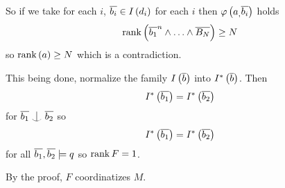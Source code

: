 \documentclass{amsart}
\begin{document}
So if we take for each $i$, $\overline{b_i}\in I\left(d_i\right)$ for each $i$ then
$\varphi\left(a_, \overline{b_i}\right)$ holds
\begin{equation}
\operatorname{rank}\left(\overline{b_1}^n \land \ldots \land \overline{B_N}
\right) \geq N
\end{equation}
so $\operatorname{rank}\left(a\right)\geq N$ which is a contradiction.

This being done, normalize the family $I\left(\overline{b}\right)$ into
$I^*\left(\overline{b}\right)$. Then 
\begin{equation}
I^*\left(\overline{b_1}\right) = I^*\left(\overline{b_2}\right)
\end{equation}
for $\oline{b_1}\indfrom \oline{b_2}$ so
\begin{equation}
I^*\left(\overline{b_1}\right) = I^*\left(\overline{b_2}\right)
\end{equation}
for all $\overline{b_1},\overline{b_2}\models q$
so $\operatorname{rank} F = 1$.

By the proof, $F$ coordinatizes $M$.
\end{document}
